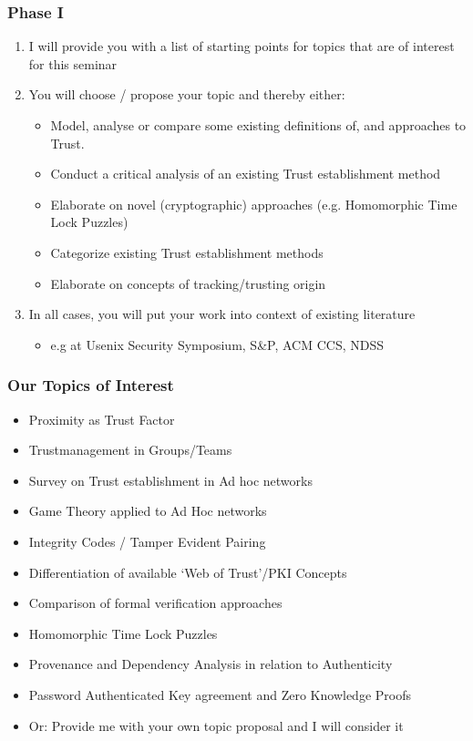 \documentclass[xcolor={usenames,dvipsnames}]{beamer}
\begin{document}
\begin{frame}
	\frametitle{Phase \alert{I}}
	\begin{enumerate}
		\item I will provide you with a list of starting points for topics that are of interest for this seminar
		\item You will \alert{choose / propose} your topic and thereby either:
			\begin{itemize}
				\item Model, analyse or compare some existing definitions of, and approaches to Trust.
				\item Conduct a critical analysis of an existing Trust establishment method
				\item Elaborate on novel (cryptographic) approaches (e.g. Homomorphic Time Lock Puzzles)
				\item Categorize existing Trust establishment methods 
				\item Elaborate on concepts of tracking/trusting origin
			\end{itemize}
		\item In all cases, you will put your work into context of existing literature
			\begin{itemize}
				\item e.g at Usenix Security Symposium, S\&P, ACM CCS, NDSS
			\end{itemize}
	\end{enumerate}
\end{frame}

\begin{frame}
	\frametitle{Our Topics of Interest}
	\begin{itemize}
		\item Proximity as Trust Factor
		\item Trustmanagement in Groups/Teams
		\item Survey on Trust establishment in Ad hoc networks
		\item Game Theory applied to Ad Hoc networks
		\item Integrity Codes / Tamper Evident Pairing
		\item Differentiation of available `Web of Trust'/PKI Concepts
		\item Comparison of formal verification approaches
		\item Homomorphic Time Lock Puzzles
		\item Provenance and Dependency Analysis in relation to Authenticity
		\item Password Authenticated Key agreement and Zero Knowledge Proofs
		\item \alert{Or:} Provide me with your own topic proposal and I will consider it
	\end{itemize}
\end{frame}
\end{document}
